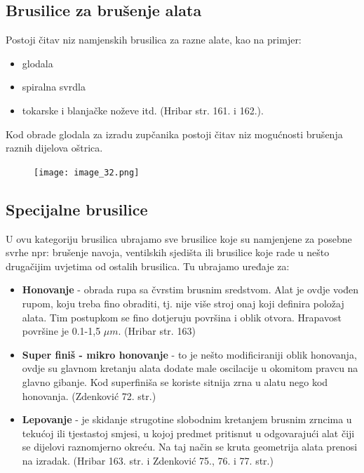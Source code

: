 \documentclass[a4paper,12pt]{article}
\numberwithin{figure}{section}
\begin{document}
\subsection{Brusilice za brušenje alata}
Postoji čitav niz namjenskih brusilica za razne alate, kao na primjer:
\begin{itemize}
\item glodala
\item spiralna svrdla
\item tokarske i blanjačke noževe itd. (Hribar str. 161. i 162.).
\end{itemize}
Kod obrade glodala za izradu zupčanika postoji čitav niz mogućnosti brušenja raznih dijelova oštrica.
\begin{figure}[!h]
\centering
\texttt{[image: image\_32.png]}
\end{figure}
\FloatBarrier
\subsection{Specijalne brusilice}
U ovu kategoriju brusilica ubrajamo sve brusilice koje su namjenjene za posebne svrhe npr: brušenje navoja, ventilskih sjedišta ili brusilice koje rade u nešto drugačijim uvjetima od ostalih brusilica. Tu ubrajamo uređaje za:
\begin{itemize}
\item \textbf{Honovanje} - obrada rupa sa čvrstim brusnim sredstvom. Alat je ovdje vođen rupom, koju treba fino obraditi, tj. nije više stroj onaj koji definira položaj alata. Tim postupkom se fino dotjeruju površina i oblik otvora. Hrapavost površine je 0.1-1,5 $\mu m$. (Hribar str. 163)
\item \textbf{Super finiš - mikro honovanje} - to je nešto modificiraniji oblik honovanja, ovdje su glavnom kretanju alata dodate male oscilacije u okomitom pravcu na glavno gibanje. Kod superfiniša se koriste sitnija zrna u alatu nego kod honovanja. (Zdenković 72. str.)
\item \textbf{Lepovanje} - je skidanje strugotine slobodnim kretanjem brusnim zrncima u tekućoj ili tjestastoj smjesi, u kojoj predmet pritisnut u odgovarajući alat čiji se dijelovi raznomjerno okreću. Na taj način se kruta geometrija alata prenosi na izradak. (Hribar 163. str. i Zdenković 75., 76. i 77. str.)
\end{itemize}
\end{document}
